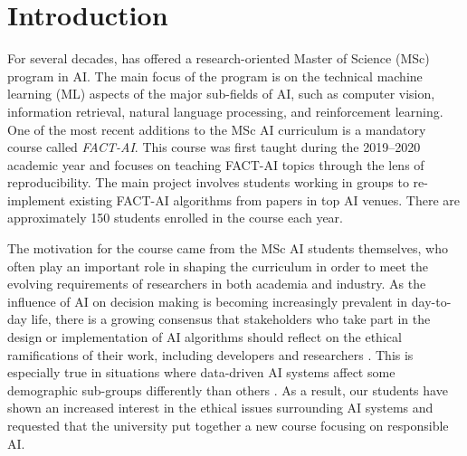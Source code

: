 

\section{Introduction}
\label{section:fact-introduction}

For several decades, \OurUniversity{} has offered a research-oriented Master of Science (MSc) program in AI. 
The main focus of the program is on the technical machine learning (ML) aspects of the major sub-fields of AI, such as computer vision, information retrieval, natural language processing, and reinforcement learning.
One of the most recent additions to the MSc AI curriculum is a mandatory course called \emph{\ac{FACT-AI}}. 
This course was first taught during the 2019--2020 academic year and focuses on teaching FACT-AI topics through the lens of reproducibility. 
The main project involves students working in groups to re-implement existing FACT-AI algorithms from papers in top AI venues. 
There are approximately 150 students enrolled in the course each year. 

The motivation for the course came from the MSc AI students themselves, who often play an important role in shaping the curriculum in order to meet the evolving requirements of researchers in both academia and industry. 
As the influence of AI on decision making is becoming increasingly prevalent in day-to-day life, there is a growing consensus that stakeholders who take part in the design or implementation of AI algorithms should reflect on the ethical ramifications of their work, including developers and researchers \citep{campbell2021_responsible}. 
This is especially true in situations where data-driven AI systems affect some demographic sub-groups differently than others \citep{propublica, o2017ivory}.
As a result, our students have shown an increased interest in the ethical issues surrounding AI systems and requested that the university put together a new course focusing on responsible AI.

